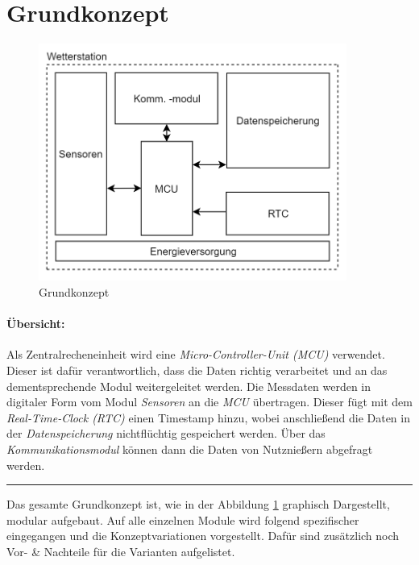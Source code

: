 \section{Grundkonzept}
\label{chap:grundkonzept}
\begin{figure}[h]
	\centering
	\includegraphics[width=0.9\textwidth]{graphics/Grundkonzept.PNG}
	\caption{Grundkonzept}
	\label{fig:grundkonzept}
\end{figure}

\paragraph{Übersicht:}
Als Zentralrecheneinheit wird eine \textit{Micro-Controller-Unit (MCU)} verwendet. Dieser ist dafür verantwortlich, dass die Daten richtig verarbeitet und an das dementsprechende Modul weitergeleitet werden. Die Messdaten werden in digitaler Form vom Modul \textit{Sensoren} an die \textit{MCU} übertragen. Dieser fügt mit dem \textit{Real-Time-Clock (RTC)} einen Timestamp hinzu, wobei anschließend die Daten in der \textit{Datenspeicherung} nichtflüchtig gespeichert werden. Über das \textit{Kommunikationsmodul} können dann die Daten von Nutznießern abgefragt werden.

\vspace{0.5cm}
\hrule
\vspace{0.25cm}

Das gesamte Grundkonzept ist, wie in der Abbildung \ref{fig:grundkonzept} graphisch Dargestellt, modular aufgebaut. Auf alle einzelnen Module wird folgend spezifischer eingegangen und die Konzeptvariationen vorgestellt. Dafür sind zusätzlich noch Vor- \& Nachteile für die Varianten aufgelistet.\\
\newpage

